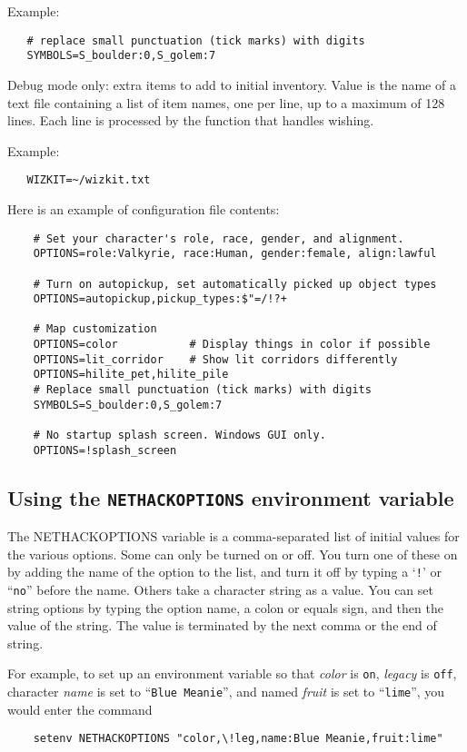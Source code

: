 Example:
\begin{verbatim}
   # replace small punctuation (tick marks) with digits
   SYMBOLS=S_boulder:0,S_golem:7
\end{verbatim}

\item[\bb{WIZKIT}]
Debug mode only:  extra items to add to initial inventory.
Value is the name of a text file containing a list of item names,
one per line, up to a maximum of 128 lines.
Each line is processed by the function that handles wishing.

Example:
\begin{verbatim}
   WIZKIT=~/wizkit.txt
\end{verbatim}
\elist

Here is an example of configuration file contents:
\begin{verbatim}
    # Set your character's role, race, gender, and alignment.
    OPTIONS=role:Valkyrie, race:Human, gender:female, align:lawful

    # Turn on autopickup, set automatically picked up object types
    OPTIONS=autopickup,pickup_types:$"=/!?+

    # Map customization
    OPTIONS=color           # Display things in color if possible
    OPTIONS=lit_corridor    # Show lit corridors differently
    OPTIONS=hilite_pet,hilite_pile
    # Replace small punctuation (tick marks) with digits
    SYMBOLS=S_boulder:0,S_golem:7

    # No startup splash screen. Windows GUI only.
    OPTIONS=!splash_screen
\end{verbatim}

\subsection*{Using the {\tt NETHACKOPTIONS} environment variable}

The NETHACKOPTIONS variable is a comma-separated list of initial
values for the various options.  Some can only be turned on or off.
You turn one of these on by adding the name of the option to the list,
and turn it off by typing a `{\tt !}' or ``{\tt no}'' before the name.
Others take a
character string as a value.  You can set string options by typing
the option name, a colon or equals sign, and then the value of the string.
The value is terminated by the next comma or the end of string.

For example, to set up an environment variable so that
{\it color\/} is {\tt on},
{\it legacy\/} is {\tt off},
character {\it name\/} is set to ``{\tt Blue Meanie}'',
and named {\it fruit\/} is set to ``{\tt lime}'',
you would enter the command
\begin{verbatim}
    setenv NETHACKOPTIONS "color,\!leg,name:Blue Meanie,fruit:lime"
\end{verbatim}

